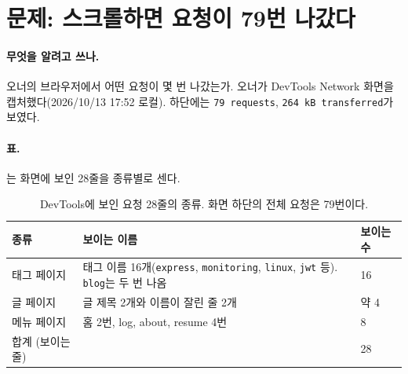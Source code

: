 \section{문제: 스크롤하면 요청이 79번 나갔다}\label{sec:pf-problem}

\paragraph{무엇을 알려고 쓰나.}
오너의 브라우저에서 어떤 요청이 몇 번 나갔는가.
오너가 DevTools Network 화면을 캡처했다(2026/10/13 17:52 로컬).
하단에는 \texttt{79 requests}, \texttt{264 kB transferred}가 보였다.

\paragraph{표.}
는 화면에 보인 28줄을 종류별로 센다.

\begin{table}[H]
  \caption{DevTools에 보인 요청 28줄의 종류. 화면 하단의 전체 요청은 79번이다.}
  \label{tab:pf-observed}
  \centering\small
  \begin{tabularx}{\linewidth}{@{}L{2.6cm}Y L{2.4cm}@{}}
    \toprule
    종류 & 보이는 이름 & 보이는 수 \\
    \midrule
    태그 페이지 & 태그 이름 16개(\texttt{express}, \texttt{monitoring}, \texttt{linux}, \texttt{jwt} 등). \texttt{blog}는 두 번 나옴 & 16 \\
    \midrule
    글 페이지 & 글 제목 2개와 이름이 잘린 줄 2개 & 약 4 \\
    \midrule
    메뉴 페이지 & 홈 2번, log, about, resume 4번 & 8 \\
    \midrule
    합계 (보이는 줄) &  & 28 \\
    \bottomrule
  \end{tabularx}
\end{table}

